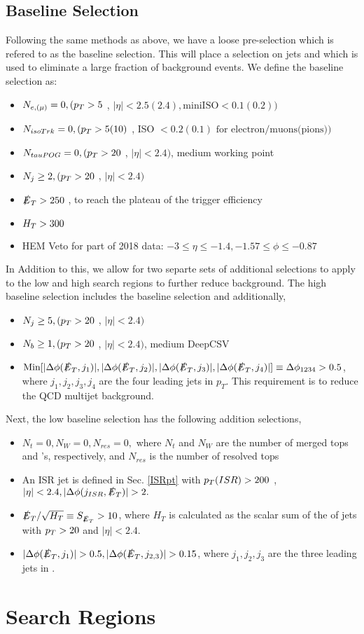 \subsection{Baseline Selection} \label{Baseline}

Following the same methods as above, we have a loose pre-selection which is refered to as the baseline selection. This will place a selection on jets and \met which is used to eliminate a large fraction of background events. We define the baseline selection as:
\begin{itemize}
	\item $N_{e,(\mu)} = 0, (p_{T}>5$ \GeV, $|\eta|<2.5(2.4), \text{miniISO}<0.1(0.2))$
	\item $N_{isoTrk} = 0, (p_{T} > 5 (10)$ \GeV, ISO $< 0.2(0.1) \text{ for electron/muons(pions)})$
	\item $N_{tauPOG} = 0, (p_{T} > 20$ \GeV, $|\eta|<2.4)$, medium working point
	\item $N_{j} \geq 2, (p_{T} >20$ \GeV, $|\eta|<2.4)$
	\item $\slashed{E}_{T} >250$ \GeV, to reach the plateau of the trigger efficiency
	\item $H_{T}>300$ \GeV
	\item HEM Veto for part of 2018 data: $-3\leq\eta\leq-1.4, -1.57\leq\phi\leq-0.87$
\end{itemize}
In Addition to this, we allow for two separte sets of additional selections to apply to the low and high \dm{} search regions to further reduce background. The high \dm{} baseline selection includes the baseline selection and additionally,
\begin{itemize}
	\item $N_j\geq 5, (p_{T} >20$ \GeV, $|\eta|<2.4)$
	\item $N_b\geq 1, (p_{T} >20$ \GeV, $|\eta|<2.4)$, medium DeepCSV
	\item $\text{Min}[|\Delta\phi(\slashed{E}_{T},j_1)|,|\Delta\phi(\slashed{E}_{T},j_2)|,|\Delta\phi(\slashed{E}_{T},j_3)|,|\Delta\phi(\slashed{E}_{T},j_4)|]\equiv\Delta\phi_{1234}>0.5$, where $j_1, j_2, j_3, j_4$ are the four leading jets in $p_T$. This requirement is to reduce the QCD multijet background. 
\end{itemize}
Next, the low \dm{} baseline selection has the following addition selections,
\begin{itemize}
	\item $N_t=0, N_W=0,N_{res}=0,$ where $N_t$ and $N_W$ are the number of merged tops and \W's, respectively, and $N_{res}$ is the number of resolved tops
	\item An ISR jet is defined in Sec. \ref{ISRpt} with $p_{T}(ISR)>200$ \GeV, $|\eta|<2.4, |\Delta\phi(j_{ISR},\met)|>2.$
	\item $\slashed{E}_{T}/\sqrt{H_{T}}\equiv S_{\slashed{E}_{T}}>10$, where $H_T$ is calculated as the scalar sum of the \pt of jets with $p_{T} >20$ \GeV{} and $|\eta|<2.4.$
	\item $|\Delta\phi(\met,j_1)|>0.5, |\Delta\phi(\met,j_{2,3})|>0.15$, where $j_1,j_2,j_3$ are the three leading jets in \pt. 
\end{itemize}


\section{Search Regions}


